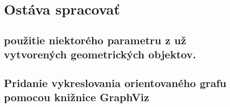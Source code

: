 \chapter{Ostáva spracovať}



\section{použitie niektorého parametru z už vytvorených geometrických objektov.}


\section{Pridanie vykreslovania orientovaného grafu pomocou knižnice GraphViz}



